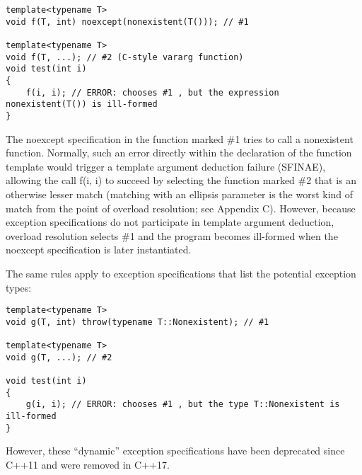 \begin{lstlisting}[style=styleCXX]
template<typename T>
void f(T, int) noexcept(nonexistent(T())); // #1

template<typename T>
void f(T, ...); // #2 (C-style vararg function)
void test(int i)
{
	f(i, i); // ERROR: chooses #1 , but the expression nonexistent(T()) is ill-formed
}
\end{lstlisting}

The noexcept specification in the function marked \#1 tries to call a nonexistent function. Normally, such an error directly within the declaration of the function template would trigger a template argument deduction failure (SFINAE), allowing the call f(i, i) to succeed by selecting the function marked \#2 that is an otherwise lesser match (matching with an ellipsis parameter is the worst kind of match from the point of overload resolution; see Appendix C). However, because exception specifications do not participate in template argument deduction, overload resolution selects \#1 and the program becomes ill-formed when the noexcept specification is later instantiated.

The same rules apply to exception specifications that list the potential exception types:

\begin{lstlisting}[style=styleCXX]
template<typename T>
void g(T, int) throw(typename T::Nonexistent); // #1

template<typename T>
void g(T, ...); // #2

void test(int i)
{
	g(i, i); // ERROR: chooses #1 , but the type T::Nonexistent is ill-formed
}
\end{lstlisting}

However, these “dynamic” exception specifications have been deprecated since C++11 and were removed in C++17.


















